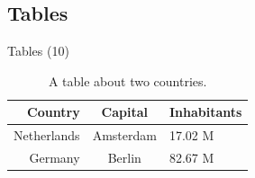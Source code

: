 \documentclass{beamer}
\begin{document}



\subsection{Tables}

\begin{frame}{Tables (10)}
    \begin{table}[ht]
        \centering
        \begin{tabular}{|r|cl|}
            \hline
            Country     & Capital   & Inhabitants \\
            \hline
            Netherlands & Amsterdam & 17.02 M     \\
            Germany     & Berlin    & 82.67 M     \\
            \hline
        \end{tabular}
        \caption{A table about two countries.}
        \label{tbltables}
    \end{table}
\end{frame}
\end{document}
